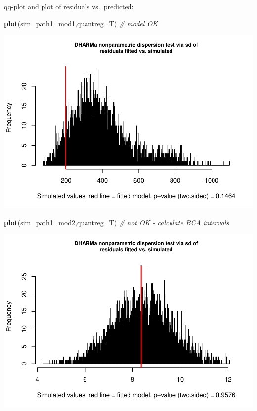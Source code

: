 \documentclass[
]{article}
\newenvironment{Shaded}{\begin{snugshade}}{\end{snugshade}}
\newcommand{\CommentTok}[1]{\textcolor[rgb]{0.56,0.35,0.01}{\textit{#1}}}
\newcommand{\DataTypeTok}[1]{\textcolor[rgb]{0.13,0.29,0.53}{#1}}
\newcommand{\KeywordTok}[1]{\textcolor[rgb]{0.13,0.29,0.53}{\textbf{#1}}}
\newcommand{\NormalTok}[1]{#1}
\begin{document}
qq-plot and plot of residuals vs.~predicted:

\begin{Shaded}
\begin{Highlighting}[]
\KeywordTok{plot}\NormalTok{(sim\_path1\_mod1,}\DataTypeTok{quantreg=}\NormalTok{T) }\CommentTok{\# model OK}
\end{Highlighting}
\end{Shaded}

\includegraphics{lathyrus_ms3_3_after_rev_Ecology_files/figure-latex/unnamed-chunk-9-1.pdf}

\begin{Shaded}
\begin{Highlighting}[]
\KeywordTok{plot}\NormalTok{(sim\_path1\_mod2,}\DataTypeTok{quantreg=}\NormalTok{T) }\CommentTok{\# not OK {-} calculate BCA intervals}
\end{Highlighting}
\end{Shaded}

\includegraphics{lathyrus_ms3_3_after_rev_Ecology_files/figure-latex/unnamed-chunk-9-2.pdf}
\end{document}
